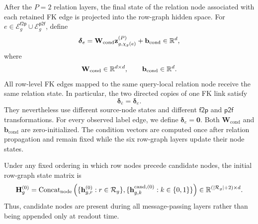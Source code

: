 After the \(P=2\) relation layers, the final state of the relation node
associated with each retained FK edge is projected into the row-graph
hidden space. For
\(e\in\mathcal E_g^{\mathsf{f2p}}\cup
\mathcal E_g^{\mathsf{p2f}}\), define
\begin{equation}
  \boldsymbol\delta_e
  =
  \mathbf W_{\mathrm{cond}}
  \mathbf z_{g,\chi_g(e)}^{(P)}
  +\mathbf b_{\mathrm{cond}}
  \in\mathbb{R}^d,
\label{eq:method:fk-condition}
\end{equation}
where
\begin{equation}
  \mathbf W_{\mathrm{cond}}\in\mathbb{R}^{d\times d},
  \qquad
  \mathbf b_{\mathrm{cond}}\in\mathbb{R}^d.
\label{eq:method:condition-parameter-domains}
\end{equation}
All row-level FK edges mapped to the same query-local relation node receive
the same relation state. In particular, the two directed copies of one FK
link satisfy
\begin{equation}
  \boldsymbol\delta_{\bar e}=\boldsymbol\delta_e.
\label{eq:method:shared-forward-reverse-condition}
\end{equation}
They nevertheless use different source-node states and different
\(\mathsf{f2p}\) and \(\mathsf{p2f}\) transformations. For every observed
label edge, we define \(\boldsymbol\delta_e=\mathbf0\). Both
\(\mathbf W_{\mathrm{cond}}\) and \(\mathbf b_{\mathrm{cond}}\) are
zero-initialized. The condition vectors are computed once after relation
propagation and remain fixed while the six row-graph layers update their
node states.

Under any fixed ordering in which row nodes precede candidate nodes, the
initial row-graph state matrix is
\begin{equation}
  \mathbf H_g^{(0)}
  =
  \operatorname{Concat}_{\mathrm{node}}
  \left(
    \{\mathbf h_{g,r}^{(0)}:r\in\mathcal R_g\},
    \{\mathbf h_{g,k}^{\mathrm{cand},(0)}:k\in\{0,1\}\}
  \right)
  \in\mathbb{R}^{(|\mathcal R_g|+2)\times d}.
\label{eq:method:main-initial-state}
\end{equation}
Thus, candidate nodes are present during all message-passing layers rather
than being appended only at readout time.

